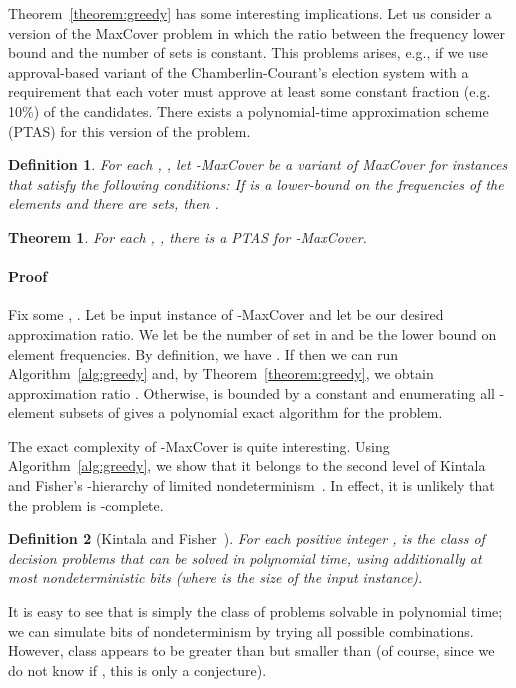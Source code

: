 \documentclass[11pt]{article}
\newtheorem{theorem}{Theorem}
\newtheorem{definition}{Definition}
\newenvironment{proof}{\paragraph{Proof}}{\hfill\medskip}
\begin{document}
Theorem~\ref{theorem:greedy} has some interesting implications. Let us
consider a version of the MaxCover problem in which the ratio
 between the frequency lower bound  and the number of
sets  is constant.  This problems arises, e.g., if we use
approval-based variant of the Chamberlin-Courant's election system
with a requirement that each voter must approve at least some constant
fraction (e.g. 10\%) of the candidates. There exists a polynomial-time
approximation scheme (PTAS) for this version of the problem.

\begin{definition}
  For each , ,  let
  -MaxCover be a variant of MaxCover for instances that
  satisfy the following conditions: If  is a lower-bound on the
  frequencies of the elements and there are  sets, then
  .
\end{definition}

\begin{theorem}\label{thm:ptas}
  For each , , there is a PTAS for
  -MaxCover.
\end{theorem}
\begin{proof}
  Fix some , .  Let  be
  input instance of -MaxCover and let  be our desired
  approximation ratio.  We let  be the number of set in  and
   be the lower bound on element frequencies. By definition, we
  have .  If 
  then we can run Algorithm~\ref{alg:greedy} and, by
  Theorem~\ref{theorem:greedy}, we obtain approximation ratio
  . Otherwise,  is bounded by a constant and enumerating all
  -element subsets of  gives a polynomial exact algorithm
  for the problem.~
\end{proof}


The exact complexity of -MaxCover is quite interesting.  Using
Algorithm~\ref{alg:greedy}, we show that it belongs to the second
level of Kintala and Fisher's -hierarchy of limited
nondeterminism~\cite{fis-kin:j:beta}. In effect, it is unlikely that
the problem is -complete.

\begin{definition}[Kintala and Fisher~\cite{fis-kin:j:beta}]
  For each positive integer ,  is the class of decision
  problems that can be solved in polynomial time, using additionally
  at most  nondeterministic bits (where  is the size of
  the input instance).
\end{definition}
It is easy to see that  is simply the class of problems
solvable in polynomial time; we can simulate  bits of
nondeterminism by trying all possible combinations. However, class
 appears to be greater than  but smaller than  (of
course, since we do not know if , this is only a
conjecture).
\end{document}
